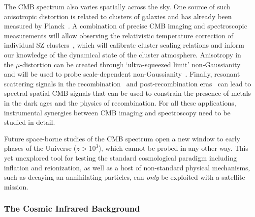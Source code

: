 The CMB spectrum also varies spatially across the sky. One source of such anisotropic distortion is related to clusters of galaxies 
and has already been measured by Planck~\citep{Planck2013SZ}. A combination of precise CMB imaging and spectroscopic measurements 
will allow observing the relativistic temperature correction of individual SZ clusters~\citep{Sazonov1998, Itoh98, Challinor98}, which 
will calibrate cluster scaling relations and inform our knowledge of the dynamical state of the cluster atmosphere. 
Anisotropy in the $\mu$-distortion can 
be created through `ultra-squeezed limit' non-Gaussianity~\citep{Pajer2012, Ganc2012} and will be used to probe 
scale-dependent non-Gaussianity~\citep{Biagetti2013, Razi2015}. Finally, resonant scattering signals in the 
recombination~\citep{Jose2005, Carlos2007Pol, Lewis2013} and post-recombination 
eras~\citep{Kaustuv2004, Schleicher2008} can lead to spectral-spatial CMB signals that can be used to constrain the 
presence of metals in the dark ages and the physics of recombination. For all these applications, instrumental synergies between 
CMB imaging and spectroscopy need to be studied in detail. 

Future space-borne studies of the CMB spectrum open a new window to early phases of the Universe ($z > 10^3$), 
which cannot be probed in any other way. This yet unexplored tool for testing the standard cosmological paradigm 
including inflation and reionization, 
as well as a host of non-standard physical mechanisms, such as decaying an annihilating particles, 
can {\it only} be exploited with a satellite mission. 


\vspace{-0.15in}
\subsubsection{The Cosmic Infrared Background}
\vspace{-0.05in}


